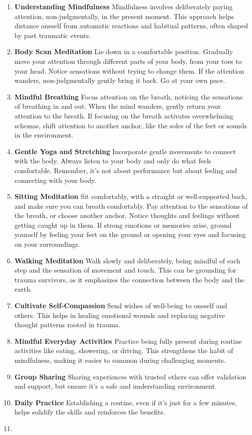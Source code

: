 \documentclass[12pt,letterpaper]{book}
\begin{document}
\begin{enumerate}
    \item \textbf{Understanding Mindfulness} Mindfulness involves deliberately paying attention, non-judgmentally, in the present moment. This approach helps distance oneself from automatic reactions and habitual patterns, often shaped by past traumatic events. 
    \item \textbf{Body Scan Meditation} Lie down in a comfortable position. Gradually move your attention through different parts of your body, from your toes to your head. Notice sensations without trying to change them. If the attention wanders, non-judgmentally gently bring it back. Go at your own pace.
    \item \textbf{Mindful Breathing} Focus attention on the breath, noticing the sensations of breathing in and out. When the mind wanders, gently return your attention to the breath. If focusing on the breath activates overwhelming schemas, shift attention to another anchor, like the soles of the feet or sounds in the environment.
    \item \textbf{Gentle Yoga and Stretching} Incorporate gentle movements to connect with the body. Always listen to your body and only do what feels comfortable. Remember, it's not about performance but about feeling and connecting with your body.
    \item \textbf{Sitting Meditation} Sit comfortably, with a straight or well-supported back, and make sure you can breath comfortably. Pay attention to the sensations of the breath, or choose another anchor. Notice thoughts and feelings without getting caught up in them. If strong emotions or memories arise, ground yourself by feeling your feet on the ground or opening your eyes and focusing on your surroundings.
    \item \textbf{Walking Meditation} Walk slowly and deliberately, being mindful of each step and the sensation of movement and touch. This can be grounding for trauma survivors, as it emphasizes the connection between the body and the earth.
    \item \textbf{Cultivate Self-Compassion} Send wishes of well-being to oneself and others. This helps in healing emotional wounds and replacing negative thought patterns rooted in trauma. 
    \item \textbf{Mindful Everyday Activities} Practice being fully present during routine activities like eating, showering, or driving. This strengthens the habit of mindfulness, making it easier to summon during challenging moments.
    \item \textbf{Group Sharing} Sharing experiences with trusted others can offer validation and support, but ensure it's a safe and understanding environment.
    \item \textbf{Daily Practice} Establishing a routine, even if it's just for a few minutes, helps solidify the skills and reinforces the benefits.
    \item {}
\end{enumerate}
\end{document}
